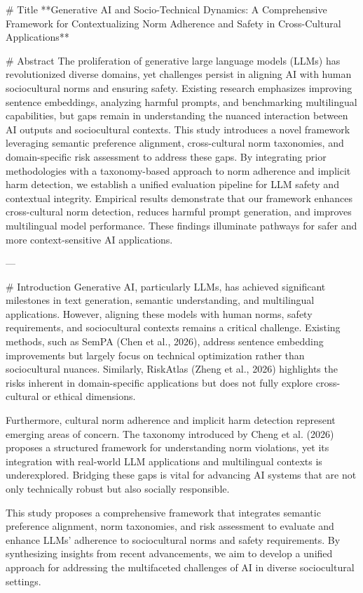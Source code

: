 # Title  
**Generative AI and Socio-Technical Dynamics: A Comprehensive Framework for Contextualizing Norm Adherence and Safety in Cross-Cultural Applications**

# Abstract  
The proliferation of generative large language models (LLMs) has revolutionized diverse domains, yet challenges persist in aligning AI with human sociocultural norms and ensuring safety. Existing research emphasizes improving sentence embeddings, analyzing harmful prompts, and benchmarking multilingual capabilities, but gaps remain in understanding the nuanced interaction between AI outputs and sociocultural contexts. This study introduces a novel framework leveraging semantic preference alignment, cross-cultural norm taxonomies, and domain-specific risk assessment to address these gaps. By integrating prior methodologies with a taxonomy-based approach to norm adherence and implicit harm detection, we establish a unified evaluation pipeline for LLM safety and contextual integrity. Empirical results demonstrate that our framework enhances cross-cultural norm detection, reduces harmful prompt generation, and improves multilingual model performance. These findings illuminate pathways for safer and more context-sensitive AI applications.

---

# Introduction  
Generative AI, particularly LLMs, has achieved significant milestones in text generation, semantic understanding, and multilingual applications. However, aligning these models with human norms, safety requirements, and sociocultural contexts remains a critical challenge. Existing methods, such as SemPA (Chen et al., 2026), address sentence embedding improvements but largely focus on technical optimization rather than sociocultural nuances. Similarly, RiskAtlas (Zheng et al., 2026) highlights the risks inherent in domain-specific applications but does not fully explore cross-cultural or ethical dimensions.

Furthermore, cultural norm adherence and implicit harm detection represent emerging areas of concern. The taxonomy introduced by Cheng et al. (2026) proposes a structured framework for understanding norm violations, yet its integration with real-world LLM applications and multilingual contexts is underexplored. Bridging these gaps is vital for advancing AI systems that are not only technically robust but also socially responsible.

This study proposes a comprehensive framework that integrates semantic preference alignment, norm taxonomies, and risk assessment to evaluate and enhance LLMs' adherence to sociocultural norms and safety requirements. By synthesizing insights from recent advancements, we aim to develop a unified approach for addressing the multifaceted challenges of AI in diverse sociocultural settings.

